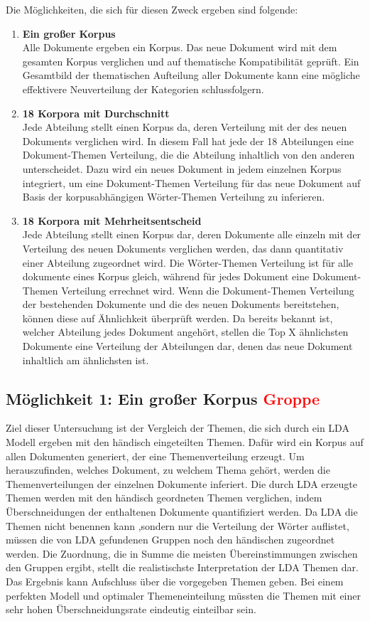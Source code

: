\documentclass[german,version-2020-11]{uzl-thesis}
\begin{document}
Die Möglichkeiten, die sich für diesen Zweck ergeben sind folgende: 
\begin{enumerate}
\item \textbf{Ein großer Korpus}\\
Alle Dokumente ergeben ein Korpus. Das neue Dokument wird mit dem gesamten Korpus verglichen und auf thematische Kompatibilität geprüft. Ein Gesamtbild der thematischen Aufteilung aller Dokumente kann eine mögliche effektivere Neuverteilung der Kategorien schlussfolgern.
\item \textbf{18 Korpora mit Durchschnitt}\\
Jede Abteilung stellt einen Korpus da, deren Verteilung mit der des neuen Dokuments verglichen wird. In diesem Fall hat jede der 18 Abteilungen eine Dokument-Themen Verteilung, die die Abteilung inhaltlich von den anderen unterscheidet. Dazu wird ein neues Dokument in jedem einzelnen Korpus integriert, um eine Dokument-Themen Verteilung für das neue Dokument auf Basis der korpusabhängigen Wörter-Themen Verteilung zu inferieren. 

\item \textbf{18 Korpora mit Mehrheitsentscheid}\\
Jede Abteilung stellt einen Korpus dar, deren Dokumente alle einzeln mit der Verteilung des neuen Dokuments verglichen werden, das dann quantitativ einer Abteilung zugeordnet wird. Die Wörter-Themen Verteilung ist für alle dokumente eines Korpus gleich, während für jedes Dokument eine Dokument-Themen Verteilung errechnet wird. Wenn die Dokument-Themen Verteilung der bestehenden Dokumente und die des neuen Dokuments bereitstehen, können diese auf Ähnlichkeit überprüft werden. Da bereits bekannt ist, welcher Abteilung jedes Dokument angehört, stellen die Top X ähnlichsten Dokumente eine Verteilung der Abteilungen dar, denen das neue Dokument inhaltlich am ähnlichsten ist. 
\end{enumerate}

\subsection{Möglichkeit 1: Ein großer Korpus \textcolor{red}{Groppe}}
Ziel dieser Untersuchung ist der Vergleich der Themen, die sich durch ein LDA Modell ergeben mit den händisch eingeteilten Themen. Dafür wird ein Korpus auf allen Dokumenten generiert, der eine Themenverteilung erzeugt. Um herauszufinden, welches Dokument, zu welchem Thema gehört, werden die Themenverteilungen der einzelnen Dokumente inferiert. Die durch LDA erzeugte Themen werden mit den händisch geordneten Themen verglichen, indem Überschneidungen der enthaltenen Dokumente quantifiziert werden.  Da LDA die Themen nicht benennen kann ,sondern nur die Verteilung der Wörter auflistet, müssen die von LDA gefundenen Gruppen noch den händischen zugeordnet werden. Die Zuordnung, die in Summe die meisten Übereinstimmungen zwischen den Gruppen ergibt, stellt die realistischste Interpretation der LDA Themen dar. Das Ergebnis kann Aufschluss über die vorgegeben  Themen geben. Bei einem perfekten Modell und optimaler Themeneinteilung  müssten die Themen mit einer sehr hohen Überschneidungsrate eindeutig einteilbar sein.  \\
\end{document}
